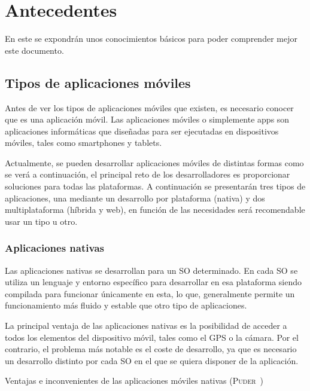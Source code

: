 \chapter{Antecedentes}
\label{chap:antecedentes}

En este se expondrán unos conocimientos básicos para poder comprender mejor este documento.

\section{Tipos de aplicaciones móviles}

Antes de ver los tipos de aplicaciones móviles que existen, es necesario conocer que es una aplicación móvil. Las aplicaciones
móviles o simplemente apps son aplicaciones informáticas que diseñadas para ser ejecutadas en dispositivos móviles, tales 
como smartphones y tablets.

Actualmente, se pueden desarrollar aplicaciones móviles de distintas formas \cite{ANADES} como se verá a continuación, el 
principal reto de los desarrolladores es proporcionar soluciones para todas las plataformas.  A continuación se presentarán 
tres tipos de aplicaciones, una mediante un desarrollo por plataforma (nativa) y dos multiplataforma (híbrida y web), en 
función de las necesidades será recomendable usar un tipo u otro.

\subsection{Aplicaciones nativas}

Las aplicaciones nativas se desarrollan para un \acf{SO} determinado. En cada \acs{SO} se utiliza un lenguaje y entorno 
específico para desarrollar en esa plataforma siendo compilada para funcionar únicamente en esta, lo que, generalmente 
permite un funcionamiento más fluido y estable que otro tipo de aplicaciones.

La principal ventaja de las aplicaciones nativas es la posibilidad de acceder a todos los elementos del dispositivo móvil, tales
como el GPS o la cámara. Por el contrario, el problema más notable es el coste de desarrollo, ya que es necesario
un desarrollo distinto por cada \acs{SO} en el que se quiera disponer de la aplicación.

\begin{table}[nativas]
	\centering
	{\small
		
	}
	\caption[Ventajas e inconvenientes de las aplicaciones móviles nativas]
	{Ventajas e inconvenientes de las aplicaciones móviles nativas
		(\textsc{Puder}~\cite{TIPAPP})}
	\label{tab:nativas}
\end{table}

